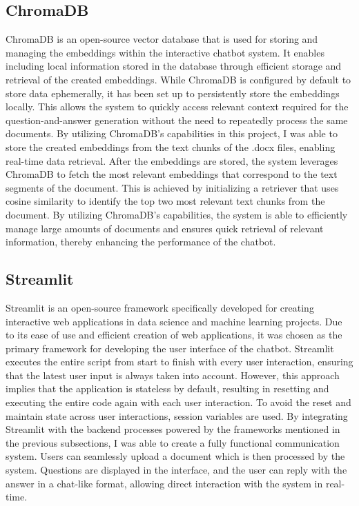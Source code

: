 \documentclass{article}
\begin{document}
\subsection{ChromaDB}
ChromaDB is an open-source vector database that is used for storing and managing the embeddings within the interactive chatbot system. It enables including local information stored in the database through efficient storage and retrieval of the created embeddings. While ChromaDB is configured by default to store data ephemerally, it has been set up to persistently store the embeddings locally. This allows the system to quickly access relevant context required for the question-and-answer generation without the need to repeatedly process the same documents. By utilizing ChromaDB's capabilities in this project, I was able to store the created embeddings from the text chunks of the .docx files, enabling real-time data retrieval. After the embeddings are stored, the system leverages ChromaDB to fetch the most relevant embeddings that correspond to the text segments of the document. This is achieved by initializing a retriever that uses cosine similarity to identify the top two most relevant text chunks from the document. By utilizing ChromaDB's capabilities, the system is able to efficiently manage large amounts of documents and ensures quick retrieval of relevant information, thereby enhancing the performance of the chatbot.
\subsection{Streamlit}
Streamlit is an open-source framework specifically developed for creating interactive web applications in data science and machine learning projects. Due to its ease of use and efficient creation of web applications, it was chosen as the primary framework for developing the user interface of the chatbot. Streamlit executes the entire script from start to finish with every user interaction, ensuring that the latest user input is always taken into account. However, this approach implies that the application is stateless by default, resulting in resetting and executing the entire code again with each user interaction. To avoid the reset and maintain state across user interactions, session variables are used. 
\newline
By integrating Streamlit with the backend processes powered by the frameworks mentioned in the previous subsections, I was able to create a fully functional communication system. Users can seamlessly upload a document which is then processed by the system. Questions are displayed in the interface, and the user can reply with the answer in a chat-like format, allowing direct interaction with the system in real-time. 
\end{document}
